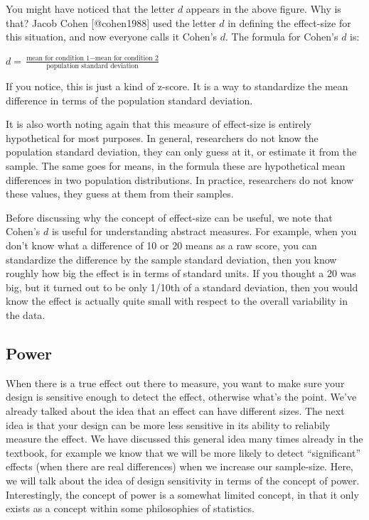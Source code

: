 \documentclass[
  letterpaper,
  DIV=11,
  numbers=noendperiod]{scrartcl}
\begin{document}
You might have noticed that the letter \(d\) appears in the above
figure. Why is that? Jacob Cohen {[}@cohen1988{]} used the letter \(d\)
in defining the effect-size for this situation, and now everyone calls
it Cohen's \(d\). The formula for Cohen's \(d\) is:

\(d = \frac{\text{mean for condition 1} - \text{mean for condition 2}}{\text{population standard deviation}}\)

If you notice, this is just a kind of z-score. It is a way to
standardize the mean difference in terms of the population standard
deviation.

It is also worth noting again that this measure of effect-size is
entirely hypothetical for most purposes. In general, researchers do not
know the population standard deviation, they can only guess at it, or
estimate it from the sample. The same goes for means, in the formula
these are hypothetical mean differences in two population distributions.
In practice, researchers do not know these values, they guess at them
from their samples.

Before discussing why the concept of effect-size can be useful, we note
that Cohen's \(d\) is useful for understanding abstract measures. For
example, when you don't know what a difference of 10 or 20 means as a
raw score, you can standardize the difference by the sample standard
deviation, then you know roughly how big the effect is in terms of
standard units. If you thought a 20 was big, but it turned out to be
only 1/10th of a standard deviation, then you would know the effect is
actually quite small with respect to the overall variability in the
data.

\hypertarget{power}{%
\subsection{Power}\label{power}}

When there is a true effect out there to measure, you want to make sure
your design is sensitive enough to detect the effect, otherwise what's
the point. We've already talked about the idea that an effect can have
different sizes. The next idea is that your design can be more less
sensitive in its ability to reliabily measure the effect. We have
discussed this general idea many times already in the textbook, for
example we know that we will be more likely to detect ``significant''
effects (when there are real differences) when we increase our
sample-size. Here, we will talk about the idea of design sensitivity in
terms of the concept of power. Interestingly, the concept of power is a
somewhat limited concept, in that it only exists as a concept within
some philosophies of statistics.
\end{document}
